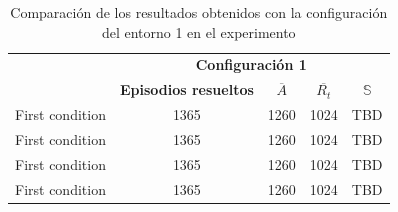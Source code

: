 \begin{table}
  \centering
  \renewcommand{\arraystretch}{1.2}
  \begin{tabular}{|p{3cm}|c|c|c|c|}
    \hline
    \multirow{2}{4cm}{} & \multicolumn{4}{c|}{\textbf{Configuración 1}}\\
    \cline{2-5}
    & \textbf{Episodios resueltos} & \textbf{$\overline{A}$} & \textbf{$\overline{R_t}$} & \textbf{$\mathbb{S}$}\\
    \hline
    First condition & 1365 & 1260 & 1024 & TBD\\ \hline
    First condition & 1365 & 1260 & 1024 & TBD\\ \hline     
    First condition & 1365 & 1260 & 1024 & TBD\\ \hline
    First condition & 1365 & 1260 & 1024 & TBD\\ \hline
\end{tabular}
  \caption{Comparación de los resultados obtenidos con la configuración del entorno 1 en el experimento}
\end{table}
